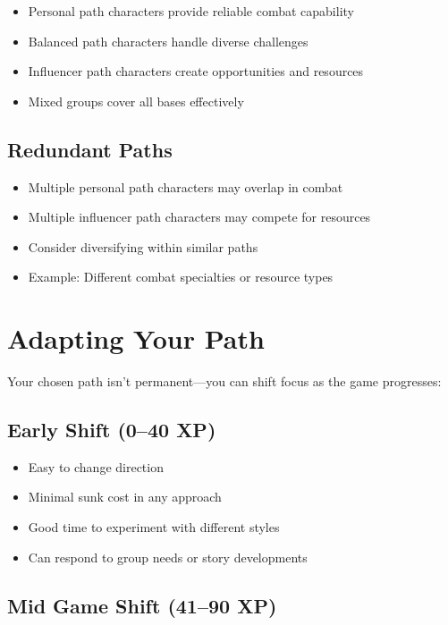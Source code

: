 \documentclass[11pt,twoside,openany]{book}
\begin{document}
\begin{itemize}
\item Personal path characters provide reliable combat capability
\item Balanced path characters handle diverse challenges
\item Influencer path characters create opportunities and resources
\item Mixed groups cover all bases effectively
\end{itemize}

\subsection*{Redundant Paths}

\begin{itemize}
\item Multiple personal path characters may overlap in combat
\item Multiple influencer path characters may compete for resources
\item Consider diversifying within similar paths
\item Example: Different combat specialties or resource types
\end{itemize}

\section*{Adapting Your Path} 

Your chosen path isn't permanent---you can shift focus as the game progresses:

\subsection*{Early Shift (0--40 XP)}

\begin{itemize}
\item Easy to change direction
\item Minimal sunk cost in any approach
\item Good time to experiment with different styles
\item Can respond to group needs or story developments
\end{itemize}

\subsection*{Mid Game Shift (41--90 XP)}
\end{document}
